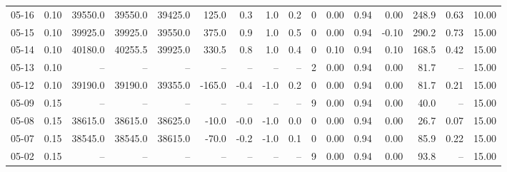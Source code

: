 \begin{threeparttable}
{\begin{tabular}{lrrrrrrrrrrrrrrr}
  05-16 &     0.10 & 39550.0 & 39550.0 & 39425.0 &      125.0 &            0.3 &                      1.0 &                 0.2 &              0 &       0.00 &      0.94 &           0.00 &            248.9 &            0.63 &                  10.00 \\
  05-15 &     0.10 & 39925.0 & 39925.0 & 39550.0 &      375.0 &            0.9 &                      1.0 &                 0.5 &              0 &       0.00 &      0.94 &          -0.10 &            290.2 &            0.73 &                  15.00 \\
  05-14 &     0.10 & 40180.0 & 40255.5 & 39925.0 &      330.5 &            0.8 &                      1.0 &                 0.4 &              0 &       0.10 &      0.94 &           0.10 &            168.5 &            0.42 &                  15.00 \\
  05-13 &     0.10 &      -- &      -- &      -- &         -- &             -- &                       -- &                  -- &              2 &       0.00 &      0.94 &           0.00 &             81.7 &              -- &                  15.00 \\
  05-12 &     0.10 & 39190.0 & 39190.0 & 39355.0 &     -165.0 &           -0.4 &                     -1.0 &                 0.2 &              0 &       0.00 &      0.94 &           0.00 &             81.7 &            0.21 &                  15.00 \\
  05-09 &     0.15 &      -- &      -- &      -- &         -- &             -- &                       -- &                  -- &              9 &       0.00 &      0.94 &           0.00 &             40.0 &              -- &                  15.00 \\
  05-08 &     0.15 & 38615.0 & 38615.0 & 38625.0 &      -10.0 &           -0.0 &                     -1.0 &                 0.0 &              0 &       0.00 &      0.94 &           0.00 &             26.7 &            0.07 &                  15.00 \\
  05-07 &     0.15 & 38545.0 & 38545.0 & 38615.0 &      -70.0 &           -0.2 &                     -1.0 &                 0.1 &              0 &       0.00 &      0.94 &           0.00 &             85.9 &            0.22 &                  15.00 \\
  05-02 &     0.15 &      -- &      -- &      -- &         -- &             -- &                       -- &                  -- &              9 &       0.00 &      0.94 &           0.00 &             93.8 &              -- &                  15.00 \\

\end{tabular}}
\end{threeparttable}
